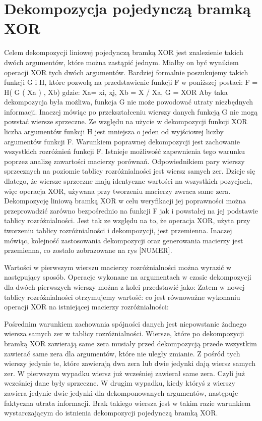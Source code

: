 \section{Dekompozycja pojedynczą bramką XOR}

Celem dekompozycji liniowej pojedynczą bramką XOR jest znalezienie takich dwóch argumentów, które można zastąpić jednym. Miałby on być wynikiem operacji XOR tych dwóch argumentów. Bardziej formalnie poszukujemy takich funkcji G i H, które pozwolą na przedstawienie funkcji F w poniższej postaci:
F = H( G ( Xa ) , Xb)
gdzie: Xa= {xi, xj}, Xb = X / Xa, G = XOR
Aby taka dekompozycja była możliwa, funkcja G nie może powodować utraty niezbędnych informacji. Inaczej mówiąc po przekształceniu wierszy danych funkcją G nie mogą powstać wiersze sprzeczne. Ze względu na użycie w dekompozycji funkcji XOR liczba argumentów funkcji H jest mniejsza o jeden od wyjściowej liczby argumentów funkcji F.
	Warunkiem poprawnej dekompozycji jest zachowanie wszystkich rozróżnień funkcji F. Istnieje możliwość zapewnienia tego warunku poprzez analizę zawartości macierzy porównań. Odpowiednikiem pary wierszy sprzecznych na poziomie tablicy rozróżnialności jest wiersz samych zer. Dzieje się dlatego, że wiersze sprzeczne mają identyczne wartości na wszystkich pozycjach, więc operacja XOR, używana przy tworzeniu macierzy zwraca same zera.
	Dekompozycję liniową bramką XOR w celu weryfikacji jej poprawności można przeprowadzić zarówno bezpośrednio na funkcji F jak i powstałej na jej podstawie tablicy rozróżnialności. Jest tak ze względu na to, że operacja XOR, użyta przy tworzeniu tablicy rozróżnialności i dekompozycji, jest przemienna. Inaczej mówiąc, kolejność zastosowania dekompozycji oraz generowania macierzy jest przemienna, co zostało zobrazowane na rys [NUMER].



Wartości w pierwszym wierszu macierzy rozróżnialności można wyrazić w następujący sposób.
Operacje wykonane na argumentach w czasie dekompozycji dla dwóch pierwszych wierszy można z kolei przedstawić jako:
Zatem w nowej tablicy rozróżnialności otrzymujemy wartość:
 co jest równoważne wykonaniu operacji XOR na istniejącej macierzy rozróżnialności:

Pośrednim warunkiem zachowania spójności danych jest niepowstanie żadnego wiersza samych zer w tablicy rozróżnialności. Wiersze, które po dekompozycji bramką XOR zawierają same zera musiały przed dekompozycją przede wszystkim zawierać same zera dla argumentów, które nie uległy zmianie. Z pośród tych wierszy jedynie te, które zawierają dwa zera lub dwie jedynki dają wiersz samych zer. W pierwszym wypadku wiersz już wcześniej zawierał same zera. Czyli już wcześniej dane były sprzeczne. W drugim wypadku, kiedy któryś z wierszy zawiera jedynie dwie jedynki dla dekomponowanych argumentów, następuje faktyczna utrata informacji. Brak takiego wiersza jest w takim razie warunkiem wystarczającym do istnienia dekompozycji pojedynczą bramką XOR.

